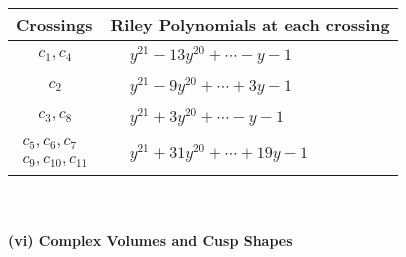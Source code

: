 \documentclass[1p]{elsarticle_modified}
\theoremstyle{definition}
\begin{document}
\begin{tabular}{m{50pt}|m{274pt}}
Crossings & \hspace{64pt}Riley Polynomials at each crossing \\
\hline $$\begin{aligned}c_{1},c_{4}\end{aligned}$$&$\begin{aligned}
&y^{21}-13 y^{20}+\cdots- y-1
\end{aligned}$\\
\hline $$\begin{aligned}c_{2}\end{aligned}$$&$\begin{aligned}
&y^{21}-9 y^{20}+\cdots+3 y-1
\end{aligned}$\\
\hline $$\begin{aligned}c_{3},c_{8}\end{aligned}$$&$\begin{aligned}
&y^{21}+3 y^{20}+\cdots- y-1
\end{aligned}$\\
\hline $$\begin{aligned}c_{5},c_{6},c_{7}\\c_{9},c_{10},c_{11}\end{aligned}$$&$\begin{aligned}
&y^{21}+31 y^{20}+\cdots+19 y-1
\end{aligned}$\\
\hline
\end{tabular}\\~\\
\newpage\flushleft \textbf{(vi) Complex Volumes and Cusp Shapes}
\end{document}
